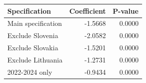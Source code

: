 \begin{tabular}{lrr}
\hline
Specification & Coefficient & P-value \\
\hline
Main specification & -1.5668 & 0.0000 \\
Exclude Slovenia & -2.0582 & 0.0000 \\
Exclude Slovakia & -1.5201 & 0.0000 \\
Exclude Lithuania & -1.2731 & 0.0000 \\
2022-2024 only & -0.9434 & 0.0000 \\
\hline
\end{tabular}
